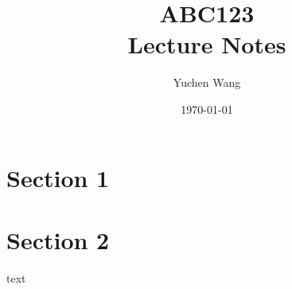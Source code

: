 \documentclass[11pt]{article}
\title{ABC123\\ Lecture Notes}
\author{Yuchen Wang}
\date{\today}
\numberwithin{equation}{section}
\begin{document}
    \maketitle
    \tableofcontents
    \newpage

\section{Section 1}
\section{Section 2}

text
\end{document}
